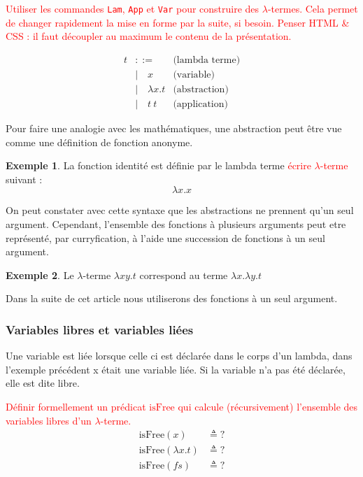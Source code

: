 \documentclass {article}
\theoremstyle{definition}
\newtheorem{example}{Exemple}
\theoremstyle{remark}
\newcommand{\todo}[1]{\textcolor{red}{#1}}
\begin{document}
\newcommand{\Lam}[2]{\ensuremath{\lambda #1. #2}}
\newcommand{\App}[2]{\ensuremath{#1\:#2}}
\newcommand{\Var}[1]{\ensuremath{#1}}

\todo{Utiliser les commandes \verb!Lam!, \verb!App! et \verb!Var!
  pour construire des $\lambda$-termes. Cela permet de changer
  rapidement la mise en forme par la suite, si besoin. Penser HTML \&
  CSS : il faut découpler au maximum le contenu de la présentation.}

\begin{align*}
  t &::= & \mbox{(lambda terme)} \\
  &|\quad \Var{x} & \mbox{(variable)} \\
  &|\quad \Lam{x}{t} & \mbox{(abstraction)} \\
  &|\quad \App{t}{t}          & \mbox{(application)}
\end{align*}

Pour faire une analogie avec les mathématiques, une abstraction peut
être vue comme une définition de fonction anonyme.
 
\begin{example}
 La fonction identité est définie par le lambda terme \todo{écrire \(\lambda\)-terme} suivant :
  \[ 
  \lambda x. x
  \]
\end{example}

On peut constater avec cette syntaxe que les abstractions ne prennent
qu'un seul argument. Cependant, l'ensemble des fonctions à plusieurs
arguments peut etre représenté, par curryfication, à l'aide une
succession de fonctions à un seul argument.

\begin{example}
Le \(\lambda\)-terme  \(\lambda x y. t\) correspond au terme
\(\lambda x.\lambda y.t\)   
\end{example} 
Dans la suite de cet article nous utiliserons des fonctions à un seul
argument.

\subsubsection{Variables libres et variables liées}

\newcommand{\IsFree}{\mathrm{isFree}}

Une variable est liée lorsque celle ci est déclarée dans le corps d'un lambda, 
dans l'exemple précédent x était une variable liée. 
Si la variable n'a pas été déclarée, elle est dite libre. 

\todo{Définir formellement un prédicat \(\IsFree\) qui calcule (récursivement)
  l'ensemble des variables libres d'un \(\lambda\)-terme.}
  \begin{align*}
    \IsFree(x) &\triangleq ? \\
    \IsFree(\lambda x. t) &\triangleq ? \\
    \IsFree(f s) &\triangleq ? \\
  \end{align*}
\end{document}
